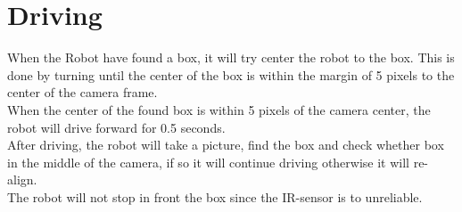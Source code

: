 \documentclass[a4paper,12pt]{article}
\begin{document}
\section{Driving}

When the Robot have found a box, it will try center the robot to the box. This is done by turning until the center of the box is within the margin of 5 pixels to the center of the camera frame. \\
When the center of the found box is within 5 pixels of the camera center, the robot will drive forward for 0.5 seconds. \\
After driving, the robot will take a picture, find the box and check whether box in the middle of the camera, if so it will continue driving otherwise it will re-align. \\
The robot will not stop in front the box since the IR-sensor is to unreliable. 
\end{document}
